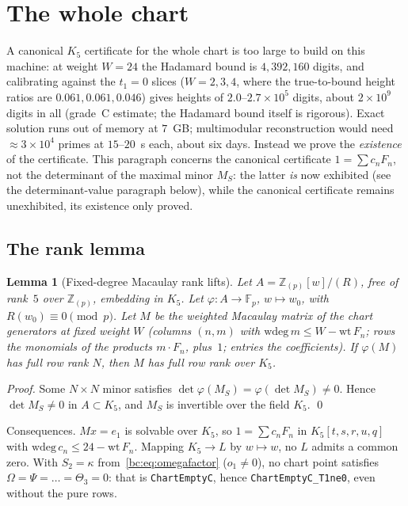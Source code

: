 \documentclass[a4paper,11pt]{article}
\theoremstyle{plain}
\newtheorem{lemma}[theorem]{Lemma}
\theoremstyle{definition}
\theoremstyle{remark}
\begin{document}
\section{The whole chart}\label{bc:sec:wholechart}

A canonical $K_5$ certificate for the whole chart is too large to build on this machine: at weight $W=24$ the Hadamard bound is $4{,}392{,}160$ digits, and calibrating against the $t_1=0$ slices ($W=2,3,4$, where the true-to-bound height ratios are $0.061,0.061,0.046$) gives heights of $2.0$--$2.7\times10^5$ digits, about $2\times10^9$ digits in all (grade~C estimate; the Hadamard bound itself is rigorous). Exact solution runs out of memory at $7$~GB; multimodular reconstruction would need $\approx3\times10^4$ primes at $15$--$20$~s each, about six days. Instead we prove the \emph{existence} of the certificate. This paragraph concerns the canonical certificate $1=\sum c_nF_n$, not the determinant of the maximal minor $M_S$: the latter \emph{is} now exhibited (see the determinant-value paragraph below), while the canonical certificate remains unexhibited, its existence only proved.

\subsection{The rank lemma}

\begin{lemma}[Fixed-degree Macaulay rank lifts]\label{bc:lem:rank}
Let $A=\mathbb{Z}_{(p)}[w]/(R)$, free of rank~$5$ over $\mathbb{Z}_{(p)}$, embedding in $K_5$. Let $\varphi:A\to\mathbb{F}_p$, $w\mapsto w_0$, with $R(w_0)\equiv0\pmod p$. Let $M$ be the weighted Macaulay matrix of the chart generators at fixed weight $W$ (columns $(n,m)$ with $\mathrm{wdeg}\,m\le W-\mathrm{wt}\,F_n$; rows the monomials of the products $m\cdot F_n$, plus~$1$; entries the coefficients). If $\varphi(M)$ has full row rank $N$, then $M$ has full row rank over $K_5$.
\end{lemma}
\begin{proof}
Some $N\times N$ minor satisfies $\det\varphi(M_S)=\varphi(\det M_S)\ne0$. Hence $\det M_S\ne0$ in $A\subset K_5$, and $M_S$ is invertible over the field $K_5$. \qed
\end{proof}

Consequences. $Mx=e_1$ is solvable over $K_5$, so $1=\sum c_nF_n$ in $K_5[t,s,r,u,q]$ with $\mathrm{wdeg}\,c_n\le24-\mathrm{wt}\,F_n$. Mapping $K_5\to L$ by $w\mapsto w$, no $L$ admits a common zero. With $S_2=\kappa$ from~\eqref{bc:eq:omegafactor} ($o_1\ne0$), no chart point satisfies $\Omega=\Psi=\dots=\Theta_3=0$: that is \texttt{ChartEmptyC}, hence \texttt{ChartEmptyC\_T1ne0}, even without the pure rows.
\end{document}
